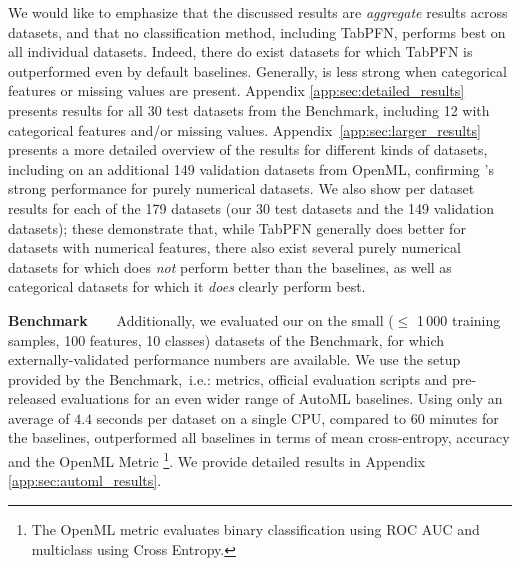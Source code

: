 \documentclass{article}
\newcommand{\slimparagraph}[1]{\textbf{#1~~~}}
\begin{document}
We would like to emphasize that the discussed results are \emph{aggregate} results across datasets, and that no classification method, including TabPFN, performs best on all individual datasets. Indeed, there do exist datasets for which TabPFN is outperformed even by default baselines.
Generally, \methodname{} is less strong when categorical features or missing values are present. Appendix \ref{app:sec:detailed_results} presents results for all 30 test datasets from the \openmlcc{} Benchmark, including 12 with categorical features and/or missing values. %
%
Appendix~\ref{app:sec:larger_results} presents a more detailed overview of the results for different kinds of datasets, including on an additional 149 validation datasets from OpenML, confirming \methodname{}'s strong performance for purely numerical datasets. We also show per dataset results for each of the 179 datasets (our 30 test datasets and the 149 validation datasets); these demonstrate that, while TabPFN generally does better for datasets with numerical features, there also exist several purely numerical datasets for which \methodname{} does \emph{not} perform better than the baselines, as well as categorical datasets for which it \emph{does} clearly perform best. %

\slimparagraph{\openmlautoml{} Benchmark} 
Additionally, we evaluated our \methodname{} on the small ($\le$ 1\,000 training samples, 100 features, 10 classes) datasets of the \openmlautoml{} Benchmark, for which externally-validated performance numbers are available.  
%
We use the setup provided by the \openmlautoml{} Benchmark,~i.e.: metrics, official evaluation scripts and pre-released evaluations for an even wider range of AutoML baselines. Using only an average of $4.4$ seconds per dataset on a single CPU, compared to 60 minutes for the baselines, \methodname{} outperformed all baselines in terms of mean cross-entropy, accuracy and the OpenML Metric \footnote{The OpenML metric evaluates binary classification using ROC AUC and multiclass using Cross Entropy.}. We provide detailed results in Appendix \ref{app:sec:automl_results}. %
\end{document}

